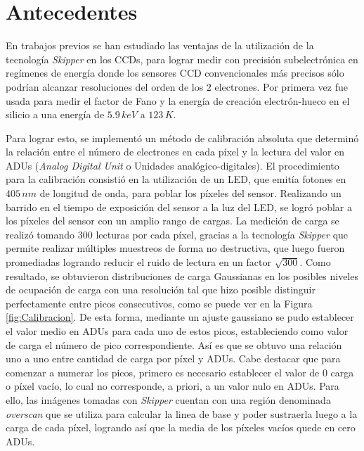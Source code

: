 \section{Antecedentes \label{sec:Antecedentes}}
\noindent En trabajos previos se han estudiado las ventajas de la utilización de la tecnología \textit{Skipper} en los CCDs, para lograr medir con precisión subelectrónica en regímenes de energía donde los sensores CCD convencionales más precisos sólo podrían alcanzar resoluciones del orden de los $2$ electrones. Por primera vez fue usada para medir el factor de Fano y la energía de creación electrón-hueco en el silicio a una energía de $5.9\,\si{keV}$ a $123\,\si{K}$\cite{Rodrigues}.

Para lograr esto, se implementó un método de calibración absoluta que determinó la relación entre el número de electrones en cada píxel y la lectura del valor en ADUs (\textit{Analog Digital Unit} o Unidades analógico-digitales). El procedimiento para la calibración consistió en la utilización de un LED, que emitía fotones en $405\,\si{nm}$ de longitud de onda, para poblar los píxeles del sensor. Realizando un barrido en el tiempo de exposición del sensor a la luz del LED, se logró poblar a los píxeles del sensor con un amplio rango de cargas. La medición de carga se realizó tomando $300$ lecturas por cada píxel, gracias a la tecnología \textit{Skipper} que permite realizar múltiples muestreos de forma no destructiva, que luego fueron promediadas logrando reducir el ruido de lectura en un factor $\sqrt{300}$. Como resultado, se obtuvieron distribuciones de carga Gaussianas en los posibles niveles de ocupación de carga con una resolución tal que hizo posible distinguir perfectamente entre picos consecutivos, como se puede ver en la Figura \ref{fig:Calibracion}. De esta forma, mediante un ajuste gaussiano se pudo establecer el valor medio en ADUs para cada uno de estos picos, estableciendo como valor de carga el número de pico correspondiente. Así es que se obtuvo una relación uno a uno entre cantidad de carga por píxel y ADUs. Cabe destacar que para comenzar a numerar los picos, primero es necesario establecer el valor de $0$ carga o píxel vacío, lo cual no corresponde, a priori, a un valor nulo en ADUs. Para ello, las imágenes tomadas con \textit{Skipper} cuentan con una región denominada \textit{overscan} que se utiliza para calcular la linea de base y poder sustraerla luego a la carga de cada píxel, logrando así que la media de los píxeles vacíos quede en cero ADUs.
